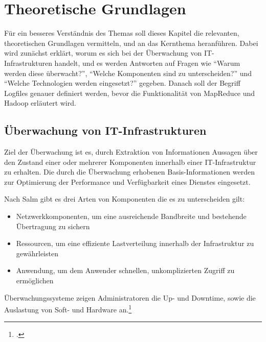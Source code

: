 
\chapter{Theoretische Grundlagen}\label{cha:Grundlagen}
Für ein besseres Verständnis des Themas soll dieses Kapitel die relevanten, theoretischen Grundlagen vermitteln,  und an das Kernthema heranführen. Dabei wird zunächst erklärt, worum es sich bei der Überwachung von IT-Infrastrukturen handelt, und es werden Antworten auf Fragen wie "`Warum werden diese überwacht?"', "`Welche Komponenten sind zu unterscheiden?"' und "`Welche Technologien werden eingesetzt?"' gegeben. Danach soll der Begriff Logfiles genauer definiert werden, bevor die Funktionalität von MapReduce und Hadoop erläutert wird.



\section{Überwachung von IT-Infrastrukturen}\label{sec:UeberwachungIT}
Ziel der Überwachung ist es, durch Extraktion von Informationen Aussagen über den Zustand einer oder mehrerer Komponenten innerhalb einer IT-Infrastruktur zu erhalten. Die durch die Überwachung erhobenen Basis-Informationen werden zur Optimierung der Performance und Verfügbarkeit eines Dienstes eingesetzt.

Nach Salm gibt es drei Arten von Komponenten die es zu unterscheiden gilt:

\begin{itemize}
	\item Netzwerkkomponenten, um eine ausreichende Bandbreite und bestehende Übertragung zu sichern
	\item Ressourcen, um eine effiziente Lastverteilung innerhalb der Infrastruktur zu gewährleisten
	\item Anwendung, um dem Anwender schnellen, unkomplizierten Zugriff zu ermöglichen
\end{itemize}

Überwachungssysteme zeigen Administratoren die Up- und Downtime, sowie die Auslastung von Soft- und Hardware an.\footcite[Vgl.][S. 8]{Salm.2007}

